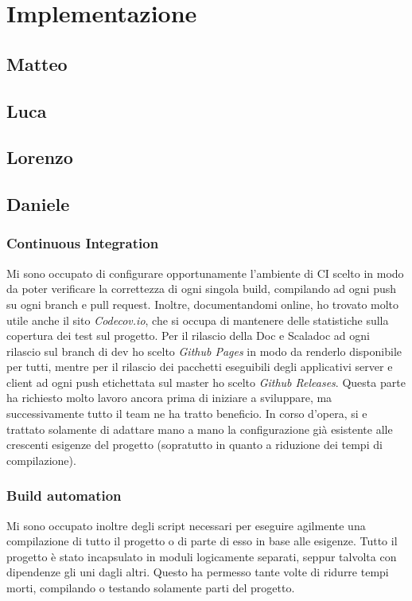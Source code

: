 \documentclass{article}
\begin{document}
    \section{Implementazione}\label{sec:implementazione}

    \subsection{Matteo}

    \subsection{Luca}

    \subsection{Lorenzo}

    \subsection{Daniele}

    \subsubsection{Continuous Integration}
    Mi sono occupato di configurare opportunamente l'ambiente di CI scelto in modo da poter verificare la correttezza di ogni singola build, compilando ad ogni push su ogni branch e pull request.
    Inoltre, documentandomi online, ho trovato molto utile anche il sito \textit{Codecov.io}, che si occupa di mantenere delle statistiche sulla copertura dei test sul progetto.
    Per il rilascio della Doc e Scaladoc ad ogni rilascio sul branch di dev ho scelto \textit{Github Pages} in modo da renderlo disponibile per tutti, mentre per il rilascio dei pacchetti eseguibili degli applicativi server e client ad ogni push etichettata sul master ho scelto \textit{Github Releases}.
    Questa parte ha richiesto molto lavoro ancora prima di iniziare a sviluppare, ma successivamente tutto il team ne ha tratto beneficio.
    In corso d'opera, si e trattato solamente di adattare mano a mano la configurazione già esistente alle crescenti esigenze del progetto (sopratutto in quanto a riduzione dei tempi di compilazione).

    \subsubsection{Build automation}
    Mi sono occupato inoltre degli script necessari per eseguire agilmente una compilazione di tutto il progetto o di parte di esso in base alle esigenze.
    Tutto il progetto è stato incapsulato in moduli logicamente separati, seppur talvolta con dipendenze gli uni dagli altri.
    Questo ha permesso tante volte di ridurre tempi morti, compilando o testando solamente parti del progetto.
\end{document}
